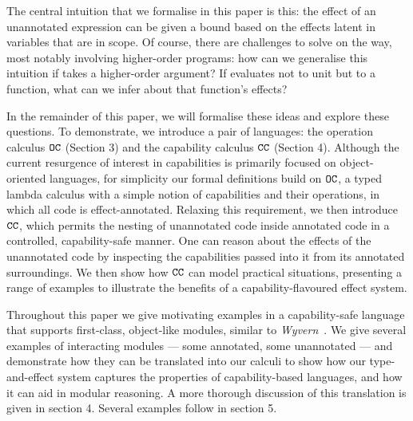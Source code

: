 The central intuition that we formalise in this paper is this: the effect of an unannotated expression can be given a bound based on the effects latent in variables that are in scope.
Of course, there are challenges to solve on the way, most notably involving higher-order programs: how can we generalise this intuition if  takes a higher-order argument?
If  evaluates not to unit but to a function, what can we infer about that function's effects?

In the remainder of this paper, we will formalise these ideas and explore these questions.
To demonstrate, we introduce a pair of languages: the operation calculus $\mathtt{OC}$ (Section 3) and the capability calculus $\mathtt{CC}$ (Section 4).
Although the current resurgence of interest in capabilities is primarily focused on object-oriented languages, for simplicity our formal definitions build on $\mathtt{OC}$, a typed lambda calculus with a simple notion of capabilities and their operations, in which all code is effect-annotated.
Relaxing this requirement, we then introduce $\mathtt{CC}$, which permits the nesting of unannotated code inside annotated code in a controlled, capability-safe manner.
One can reason about the effects of the unannotated code by inspecting the capabilities passed into it from its annotated surroundings.
We then show how $\mathtt{CC}$ can model practical situations, presenting a range of examples to illustrate the benefits of a capability-flavoured effect system.

Throughout this paper we give motivating examples in a capability-safe language %
that supports first-class, object-like modules, similar to \textit{Wyvern}~\cite{kurilova16}. We give several examples of interacting modules --- some annotated, some unannotated --- and demonstrate how they can be translated into our calculi to show how our type-and-effect system captures the properties of capability-based languages, and how it can aid in modular reasoning. A more thorough discussion of this translation is given in section 4. Several examples follow in section 5.




